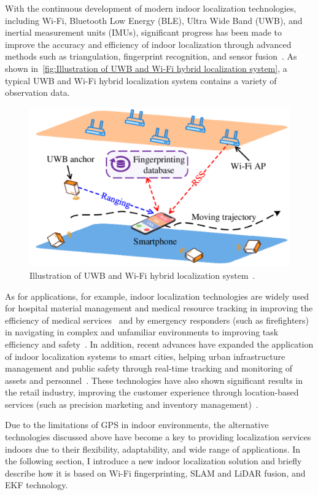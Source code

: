 \documentclass[12pt,a4paper]{article}
\numberwithin{equation}{section}
\begin{document}
With the continuous development of modern indoor localization technologies,
including Wi-Fi, Bluetooth Low Energy (BLE), Ultra Wide Band (UWB), and inertial
measurement units (IMUs), significant progress has been made to improve the
accuracy and efficiency of indoor localization through advanced methods such as
triangulation, fingerprint recognition, and sensor
fusion~\cite{guo2019survey}. As shown in~\autoref{fig:Illustration of UWB and
  Wi-Fi hybrid localization system}, a typical UWB and Wi-Fi hybrid localization
system contains a variety of observation data.
\begin{figure}[H]
  \centering
  \includegraphics[width=0.8\linewidth]{images/intro.png}
  \caption{Illustration of UWB and Wi-Fi hybrid localization
    system~\cite{article}.}
  \label{fig:Illustration of UWB and Wi-Fi hybrid localization system}
\end{figure}

As for applications, for example, indoor localization technologies are widely
used for hospital material management and medical resource tracking in improving
the efficiency of medical services~\cite{HOSSAIN20151} and by emergency
responders (such as firefighters) in navigating in complex and unfamiliar
environments to improving task efficiency and safety~\cite
{fischer2010location}. In addition, recent advances have expanded the
application of indoor localization systems to smart cities, helping urban
infrastructure management and public safety through real-time tracking and
monitoring of assets and personnel~\cite{zhang2020smartcity}. These technologies
have also shown significant results in the retail industry, improving the
customer experience through location-based services (such as precision marketing
and inventory management)~\cite{chen2019indoor}.

Due to the limitations of GPS in indoor environments, the alternative
technologies discussed above have become a key to providing localization
services indoors due to their flexibility, adaptability, and wide range of
applications. In the following section, I introduce a new indoor localization
solution and briefly describe how it is based on Wi-Fi fingerprinting, SLAM and
LiDAR fusion, and EKF technology.
\end{document}
